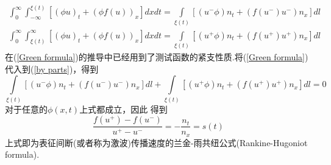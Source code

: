 	\begin{subequations} \label{Green formula}
		\begin{align}
		\int_0^{\infty}\int_{-\infty}^{\xi(t)} [(\phi u)_t + (\phi f(u))_x] dxdt  = 
		\int\limits_{\xi(t)} [(u^{-}\phi)n_t + (f(u^{-})u^{-})n_x] dl \\
		\int_0^{\infty}\int_{\xi(t)}^{\infty} [(\phi u)_t + (\phi f(u))_x] dxdt  = 
		\int\limits_{\xi(t)} [(u^{+} \phi)n_t + (f(u^{+})u^{+})n_x] dl
		\end{align}
	\end{subequations}
在(\ref{Green formula})的推导中已经用到了测试函数的紧支性质.将(\ref{Green formula})代入到(\ref{by parts})，得到
	\begin{equation*}
		\int\limits_{\xi(t)} [(u^{-}\phi)n_t + (f(u^{-})u^{-})n_x] dl + \int\limits_{\xi(t)} [(u^{+} \phi)n_t + (f(u^{+})u^{+})n_x] dl = 0
	\end{equation*}
对于任意的$\phi(x,t)$上式都成立，因此
得到
	\begin{equation}
		\frac{f(u^{+})-f(u^{-})}{u^{+} - u^{-}} = -\frac{n_t}{n_x} = s(t)
	\end{equation}
上式即为表征间断(或者称为激波)传播速度的兰金-雨共纽公式(Rankine-Hugoniot formula).